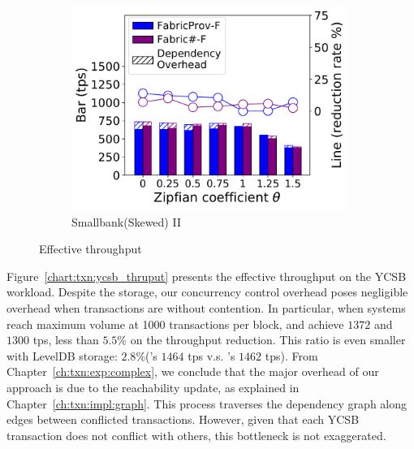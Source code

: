 \begin{figure}[t]
\begin{subfigure}{0.45\textwidth}
      \includegraphics[width=0.99\textwidth]{chart/txn/smallbank_prov.pdf}
      \caption{Smallbank(Skewed) II}
      \label{chart:txn:smallbank_prov}
    \end{subfigure}
    \caption{Effective throughput}
\end{figure}

Figure~\ref{chart:txn:ycsb_thruput} presents the effective throughput on the YCSB workload.
Despite the storage, our concurrency control overhead poses negligible overhead 
when transactions are without contention.
In particular, when systems reach maximum volume at 1000 transactions per block, {\fsO} and {\fsF} achieve $1372$ and $1300$ tps, less than $5.5$\% on the throughput reduction. 
This ratio is even smaller with LevelDB storage: $2.8$\%({\fsPrO}'s $1464$ tps v.s. {\fsPrF}'s $1462$ tps). 
From Chapter~\ref{ch:txn:exp:complex}, we conclude that the major overhead of our approach is due to the reachability update, as explained in Chapter~\ref{ch:txn:impl:graph}. 
This process traverses the dependency graph along edges between conflicted transactions. 
However, given that each YCSB transaction does not conflict with others, this bottleneck is not exaggerated.

